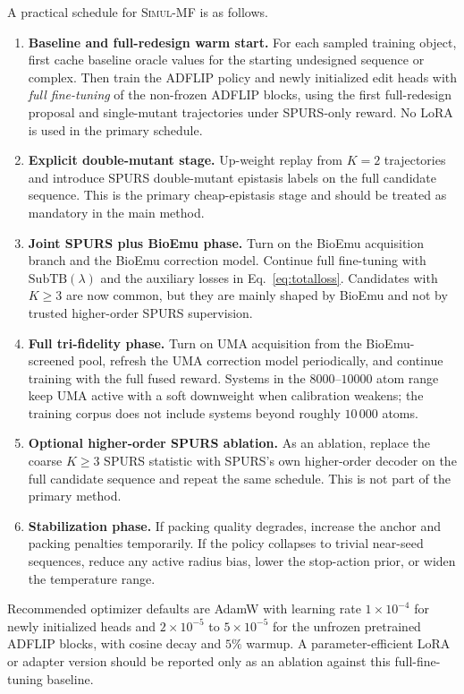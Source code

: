 \documentclass[11pt]{article}
\newcommand{\SubTB}{\ensuremath{\mathrm{SubTB}}}
\newcommand{\methodI}{\textsc{Simul-MF}}
\begin{document}
	A practical schedule for \methodI{} is as follows.
	\begin{enumerate}[leftmargin=1.5em]
		\item \textbf{Baseline and full-redesign warm start.} For each sampled training object, first cache baseline oracle values for the starting undesigned sequence or complex. Then train the ADFLIP policy and newly initialized edit heads with \emph{full fine-tuning} of the non-frozen ADFLIP blocks, using the first full-redesign proposal and single-mutant trajectories under SPURS-only reward. No LoRA is used in the primary schedule.
		\item \textbf{Explicit double-mutant stage.} Up-weight replay from $K=2$ trajectories and introduce SPURS double-mutant epistasis labels on the full candidate sequence. This is the primary cheap-epistasis stage and should be treated as mandatory in the main method.
		\item \textbf{Joint SPURS plus BioEmu phase.} Turn on the BioEmu acquisition branch and the BioEmu correction model. Continue full fine-tuning with \SubTB$(\lambda)$ and the auxiliary losses in Eq.~\eqref{eq:totalloss}. Candidates with $K\ge 3$ are now common, but they are mainly shaped by BioEmu and not by trusted higher-order SPURS supervision.
		\item \textbf{Full tri-fidelity phase.} Turn on UMA acquisition from the BioEmu-screened pool, refresh the UMA correction model periodically, and continue training with the full fused reward. Systems in the $8000$--$10000$ atom range keep UMA active with a soft downweight when calibration weakens; the training corpus does not include systems beyond roughly $10\,000$ atoms.
		\item \textbf{Optional higher-order SPURS ablation.} As an ablation, replace the coarse $K\ge 3$ SPURS statistic with SPURS's own higher-order decoder on the full candidate sequence and repeat the same schedule. This is not part of the primary method.
		\item \textbf{Stabilization phase.} If packing quality degrades, increase the anchor and packing penalties temporarily. If the policy collapses to trivial near-seed sequences, reduce any active radius bias, lower the stop-action prior, or widen the temperature range.
	\end{enumerate}
	Recommended optimizer defaults are AdamW with learning rate $1\times 10^{-4}$ for newly initialized heads and $2\times 10^{-5}$ to $5\times 10^{-5}$ for the unfrozen pretrained ADFLIP blocks, with cosine decay and $5\%$ warmup. A parameter-efficient LoRA or adapter version should be reported only as an ablation against this full-fine-tuning baseline.
	
\end{document}
